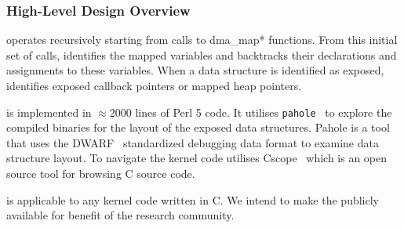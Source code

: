 

\subsubsection{High-Level Design Overview}

\tool operates recursively starting from calls to dma\_map* functions. From this initial set of calls, \tool identifies the mapped variables and backtracks their declarations and assignments to these variables. When a data structure is identified as exposed, \tool identifies exposed callback pointers or mapped heap pointers. 



\tool is implemented in $\approx$2000 lines of Perl 5 code. It utilises \texttt{pahole}~\cite{dwarves} to explore the compiled binaries for the layout of the exposed data structures. Pahole is a tool that uses the DWARF~\cite{dwarf} standardized debugging data format to examine data structure layout. To navigate the kernel code \tool utilises Cscope~\cite{cscope,cscope_92} which is an open source tool for browsing C source code.

\tool is applicable to any kernel code written in C. We intend to make the \tool publicly available for benefit of the research community.


